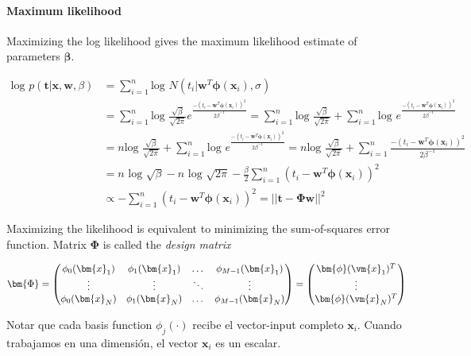 \paragraph{Maximum likelihood}

Maximizing the log likelihood gives the maximum likelihood estimate of parameters $\bm{\beta}$.

\begin{equation}\label{eq:maximum_likelihood}
 \begin{split}
   \text{log } p(\bm{t} | \bm{x}, \bm{w}, \beta) & = \sum_{i=1}^{n} \text{log } N(t_i | \bm{w}^T \bm{\phi}(\bm{x}_i), \sigma)  \\
  & =  \sum_{i=1}^{n} \text{log }  \frac{\sqrt{\beta} }{\sqrt{2\pi}} e^{\frac{-(t_i - \bm{w}^T\bm{\phi}(\bm{x}_i))^2}{2\beta^{-1}} } = \sum_{i=1}^{n} \text{log } \frac{\sqrt{\beta} }{\sqrt{2\pi}} + \sum_{i=1}^{n} \text{log } e^{\frac{-(t_i - \bm{w}^T\bm{\phi}(\bm{x}_i))^2}{2\beta^{-1}} } \\
  & = n \text{log } \frac{\sqrt{\beta} }{\sqrt{2\pi}} + \sum_{i=1}^{n} \text{log } e^{\frac{-(t_i - \bm{w}^T\bm{\phi}(\bm{x}_i))^2}{2\beta^{-1}} } = n \text{log } \frac{\sqrt{\beta} }{\sqrt{2\pi}} + \sum_{i=1}^{n}  \frac{-(t_i - \bm{w}^T\bm{\phi}(\bm{x}_i))^2}{2\beta^{-1}} \\
   &  = n \text{ log } \sqrt{\beta} - n \text{ log } \sqrt{2\pi} - \frac{\beta}{2} \sum_{i=1}^{n}  (t_i - \bm{w}^T\bm{\phi}(\bm{x}_i))^2   \\
  & \propto  - \sum_{i=1}^{n}  (t_i - \bm{w}^T\bm{\phi}(\bm{x}_i))^2 = ||\bm{t}-\bm{\Phi}\bm{w}||^2
 \end{split}
\end{equation}

Maximizing the likelihood is equivalent to minimizing the sum-of-squares error function.
Matrix $\bm{\Phi}$ is called the \emph{design matrix}

\begin{equation}
 \bm{\Phi} =
  \begin{pmatrix}
    \phi_0(\bm{x}_1) & \phi_1(\bm{x}_1) & \dots & \phi_{M-1}(\bm{x}_1)\\
    \vdots & \vdots & \ddots & \vdots \\
    \phi_0(\bm{x}_N) & \phi_1(\bm{x}_N) & \dots & \phi_{M-1}(\bm{x}_N)
  \end{pmatrix}
  = 
  \begin{pmatrix}
   \bm{\phi}(\vm{x}_1)^T \\
   \vdots \\
   \bm{\phi}(\vm{x}_N)^T \\
  \end{pmatrix}
\end{equation}

Notar que cada basis function $\phi_j(\cdot)$ recibe el vector-input completo $\bm{x}_i$.
Cuando trabajamos en una dimensi\'on, el vector $\bm{x}_i$ es un escalar.



% 



